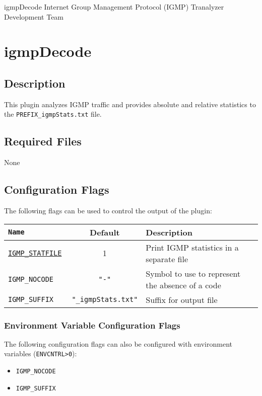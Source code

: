 \documentclass[documentation]{subfiles}
\begin{document}
\trantitle
    {igmpDecode}
    {Internet Group Management Protocol (IGMP)}
    {Tranalyzer Development Team}

\section{igmpDecode}\label{s:igmpDecode}

\subsection{Description}
This plugin analyzes IGMP traffic and provides absolute and relative statistics to the {\tt PREFIX\_igmpStats.txt} file.

\subsection{Required Files}
None

\subsection{Configuration Flags}
The following flags can be used to control the output of the plugin:
\begin{longtable}{>{\tt}lcl}
    \toprule
    {\bf Name} & {\bf Default} & {\bf Description} \\
    \midrule\endhead%
    \hyperref[igmpDecode:additonalOutput]{IGMP\_STATFILE}
                   & 1  & Print IGMP statistics in a separate file\\
    IGMP\_NOCODE   & {\tt\small "-"}
                        & Symbol to use to represent the absence of a code\\
    IGMP\_SUFFIX   & {\tt\small "\_igmpStats.txt"}
                        & Suffix for output file\\
    \bottomrule
\end{longtable}

\subsubsection{Environment Variable Configuration Flags}
The following configuration flags can also be configured with environment variables ({\tt ENVCNTRL>0}):
\begin{itemize}
    \item {\tt IGMP\_NOCODE}
    \item {\tt IGMP\_SUFFIX}
\end{itemize}
\end{document}
